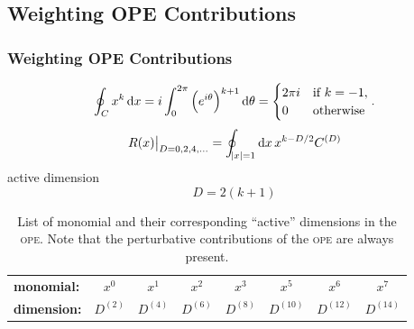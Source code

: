 \documentclass{beamer}
\begin{document}
\subsection{Weighting OPE Contributions}
\begin{frame}
  \frametitle{Weighting OPE Contributions}
  \begin{equation}
    \oint_{C} x^k \dif x = i \int_0^{2\pi}\left(e^{i \theta}\right)^{k+1} \dif \theta
    = \begin{cases} \mbox{\(2 \pi i\)} & \mbox{if } k=-1, \\ \mbox{0} & \mbox{otherwise} \end{cases}.
  \end{equation}
  \begin{equation}
    \left. R(x)\right\vert_{D=0,2,4,\dots} = \oint_{\abs{x}=1} \dif x \, x^{k-D/2} C^{(D)}
  \end{equation}
  active dimension
  \begin{equation}
    D = 2 (k+1)
  \end{equation}
  \begin{table}
    \centering
    \begin{tabular}{l|ccccccc}
      \toprule
      \textbf{monomial:} & \(x^0\) & \(x^1\) & \(x^2\) & \(x^3\) & \(x^5\) & \(x^6\) & \(x^7\)\\
      \textbf{dimension:} & \(D^{(2)}\) & \(D^{(4)}\) & \(D^{(6)}\) & \(D^{(8)}\) & \(D^{(10)}\) & \(D^{(12)}\) & \(D^{(14)}\)\\
      \bottomrule 
    \end{tabular}
    \caption{List of monomial and their corresponding ``active'' dimensions in the
      \textsc{ope}. Note that the perturbative contributions of the \textsc{ope}
      are always present.}
  \end{table}
\end{frame}
\end{document}
